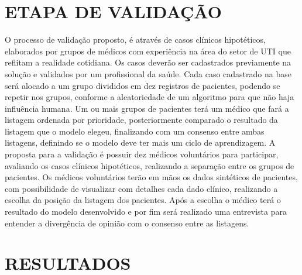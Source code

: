 \documentclass[12pt]{article}
\begin{document}
\section{ETAPA DE VALIDAÇÃO}
O processo de validação proposto, é através de casos clínicos hipotéticos, elaborados por grupos de médicos com experiência na área do setor de UTI que reflitam a realidade cotidiana. Os casos deverão ser cadastrados previamente na solução e validados por um profissional da saúde. Cada caso cadastrado na base será alocado a um grupo divididos em dez registros de pacientes, podendo se repetir nos grupos, conforme a aleatoriedade de um algoritmo para que não haja influência humana.
Um ou mais grupos de pacientes  terá  um  médico  que  fará  a  listagem  ordenada por prioridade, posteriormente comparado o resultado da listagem que o modelo elegeu, finalizando com um consenso entre ambas listagens, definindo se o modelo deve ter mais um ciclo de aprendizagem.
A proposta para a validação é possuir dez médicos voluntários para participar, avaliando os casos clínicos hipotéticos, realizando a separação entre os grupos de pacientes.
Os médicos voluntários terão em mãos os dados sintéticos de pacientes, com possibilidade de visualizar com detalhes cada dado clínico, realizando a escolha da posição da listagem dos pacientes. Após a escolha o médico terá o resultado do modelo desenvolvido e por fim será realizado uma entrevista para entender a divergência de opinião com o consenso entre as listagens.

\section{RESULTADOS}
\end{document}
